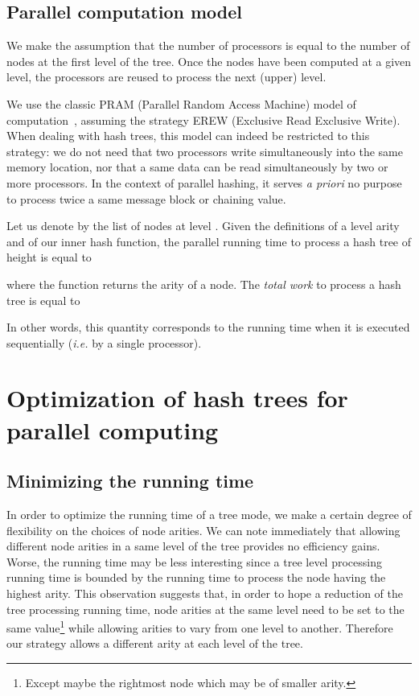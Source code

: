 \documentclass{llncs}
\begin{document}
\subsection{Parallel computation model}

We make the assumption that the number of processors is equal to the number of nodes at the first level of the tree. Once the nodes have been computed 
at a given level, the processors are reused to process the next (upper) level.

We use the classic PRAM (Parallel Random Access Machine) model of computation~\cite{GiRy88},
assuming the strategy EREW (Exclusive Read Exclusive Write). When dealing with hash trees, this model can indeed 
be restricted to this strategy: we do not need that two processors write simultaneously into the same memory location, nor that a same data
can be read simultaneously by two or more processors. In the context of parallel hashing, 
it serves \textit{a priori} no purpose to process twice a same message block or chaining value.


Let us denote by  the list of nodes at level . 
Given the definitions of a level arity and of our inner hash function, 
the parallel running time to process a hash tree of height  is equal to 

where the function  returns the arity of a node.
The \textit{total work} to process a hash tree is equal to

In other words, this quantity corresponds to the running time when it is executed 
sequentially (\textit{i.e.} by a single processor).

\section{Optimization of hash trees for parallel computing}\label{sec:optim}

\subsection{Minimizing the running time}\label{subsec:runni}

In order to optimize the running time of a tree mode, we make a certain degree of flexibility 
on the choices of node arities. 
We can note immediately that allowing different node arities in a same level of the tree provides no efficiency gains. Worse, 
the running time may be less interesting since a tree level processing running time is bounded by the running time to process the node 
having the highest arity. 
This observation suggests that, in order to hope a reduction of the tree processing running time, node arities at the same level need to be set 
to the same value\footnote{Except maybe the rightmost node which may be of smaller arity.} while allowing arities to vary from one level to another.
Therefore our strategy allows a different arity at each level of the tree.
\end{document}
